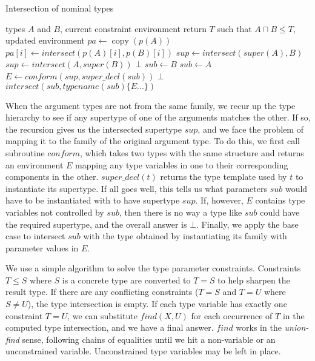 \documentclass[9pt]{sigplanconf}
\begin{document}
\begin{algorithm}
\caption{Intersection of nominal types}
\label{alg4}
\begin{algorithmic}
\REQUIRE types $A$ and $B$, current constraint environment
\ENSURE return $T$ such that $A \sqcap B \leq T$, updated environment
 \STATE $pa \leftarrow \operatorname{copy}(p(A))$
  \ENDIF
  \STATE $pa[i] \leftarrow intersect(p(A)[i],p(B)[i])$
 \ENDFOR
\ELSE
 \STATE $sup \leftarrow intersect(super(A),B)$
  \STATE $sup \leftarrow intersect(A,super(B))$
   \RETURN $\bot$
  \ELSE
   \STATE $sub \leftarrow B$
  \ENDIF
 \ELSE
  \STATE $sub \leftarrow A$
 \ENDIF
 \STATE $E \leftarrow conform(sup, super\_decl(sub))$
  \RETURN $\bot$
 \ENDIF
 \RETURN $intersect(sub, typename(sub)\{E...\})$
\ENDIF
\end{algorithmic}
\end{algorithm}

When the argument types are not from the same family, we recur up the
type hierarchy to see if any supertype of one of the arguments matches
the other. If so, the recursion gives us the intersected supertype $sup$,
and we face the problem of mapping it to the family of the original argument
type. To do this, we first call subroutine $conform$, which takes two types
with the same structure and returns an environment $E$ mapping any
type variables in one to their corresponding components in the other.
$super\_decl(t)$ returns the type template used by $t$ to instantiate its
supertype. If all goes well, this tells us what parameters $sub$ would
have to be instantiated with to have supertype $sup$. If, however, $E$
contains type variables not controlled by $sub$, then there is no way
a type like $sub$ could have the required supertype, and the overall answer
is $\bot$.
Finally, we apply the base case to intersect $sub$ with the type obtained
by instantiating its family with parameter values in $E$.

We use a simple algorithm to solve the type parameter constraints.
Constraints $T\leq S$ where $S$ is a concrete type are converted to
$T=S$ to help sharpen the result type.
If there are any conflicting constraints ($T=S$ and $T=U$ where $S\neq U$),
the type intersection is empty. If each type variable has exactly one
constraint $T=U$, we can substitute $find(X,U)$ for each occurrence
of $T$ in the computed type intersection, and we have a final answer.
$find$ works in the \emph{union-find} sense, following chains of equalities
until we hit a non-variable or an unconstrained variable. Unconstrained
type variables may be left in place.
\end{document}
